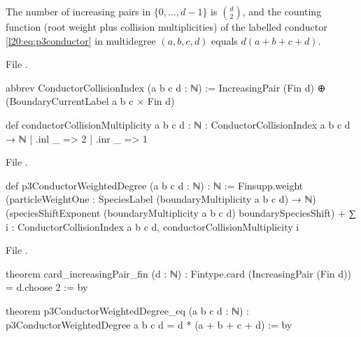 \begin{theorem}[The weighted-degree count of the $p=3$ conductor]\label{l20:thm:p3degree}
The number of increasing pairs in $\{0,\dots,d-1\}$ is $\binom d2$, and the counting function
 (root weight plus collision multiplicities) of the labelled conductor
\eqref{l20:eq:p3conductor} in multidegree $(a,b,c,d)$ equals $d(a+b+c+d)$.
\end{theorem}
\noindent File .
\begin{leancode}
abbrev ConductorCollisionIndex (a b c d : ℕ) :=
  IncreasingPair (Fin d) ⊕ (BoundaryCurrentLabel a b c × Fin d)

def conductorCollisionMultiplicity {a b c d : ℕ} :
    ConductorCollisionIndex a b c d → ℕ
  | .inl _ => 2
  | .inr _ => 1
\end{leancode}
\noindent File .
\begin{leancode}
def p3ConductorWeightedDegree (a b c d : ℕ) : ℕ :=
  Finsupp.weight
      (particleWeightOne : SpeciesLabel (boundaryMultiplicity a b c d) → ℕ)
      (speciesShiftExponent (boundaryMultiplicity a b c d) boundarySpeciesShift) +
    ∑ i : ConductorCollisionIndex a b c d, conductorCollisionMultiplicity i
\end{leancode}
\noindent File .
\begin{leancode}
theorem card_increasingPair_fin (d : ℕ) :
    Fintype.card (IncreasingPair (Fin d)) = d.choose 2 := by

theorem p3ConductorWeightedDegree_eq (a b c d : ℕ) :
    p3ConductorWeightedDegree a b c d = d * (a + b + c + d) := by
\end{leancode}

